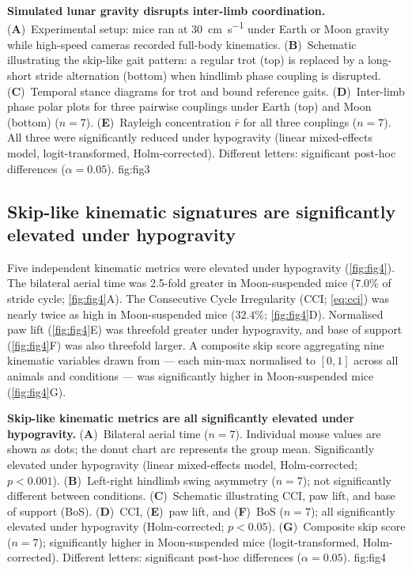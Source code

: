 \documentclass[blue]{enslyonstage}
\begin{document}
%
{%
\textbf{Simulated lunar gravity disrupts inter-limb coordination.}
(\textbf{A})~Experimental setup: mice ran at \qty{30}{\centi\metre\per\second}
under Earth or Moon gravity while high-speed cameras recorded full-body
kinematics\cite{santuzWalkingMoonHypogravity2026}.
(\textbf{B})~Schematic illustrating the skip-like gait pattern: a regular trot
(top) is replaced by a long-short stride alternation (bottom) when hindlimb
phase coupling is disrupted\cite{santuzWalkingMoonHypogravity2026}.
(\textbf{C})~Temporal stance diagrams for trot and bound reference gaits.
(\textbf{D})~Inter-limb phase polar plots for three pairwise couplings under
Earth (top) and Moon (bottom) ($n = 7$).
(\textbf{E})~Rayleigh concentration $\bar r$ for all three couplings ($n = 7$).
All three were significantly reduced under hypogravity (linear mixed-effects
model, logit-transformed, Holm-corrected). Different letters: significant
post-hoc differences ($\alpha = 0.05$).%
}{fig:fig3}

\subsection{Skip-like kinematic signatures are significantly elevated under hypogravity}

Five independent kinematic metrics were elevated under hypogravity
(\autoref{fig:fig4}). The bilateral aerial time was 2.5-fold greater in
Moon-suspended mice ($7.0\%$ of stride cycle; \autoref{fig:fig4}A). The
Consecutive Cycle Irregularity (CCI; \autoref{eq:cci}) was nearly twice as
high in Moon-suspended mice ($32.4\%$; \autoref{fig:fig4}D). Normalised paw
lift (\autoref{fig:fig4}E) was threefold greater under hypogravity, and base
of support (\autoref{fig:fig4}F) was also threefold larger. A composite skip
score aggregating nine kinematic variables drawn from
 --- each min-max normalised to $[0, 1]$
across all animals and conditions --- was significantly higher in Moon-suspended
mice (\autoref{fig:fig4}G).

%
{%
\textbf{Skip-like kinematic metrics are all significantly elevated under
hypogravity.}
(\textbf{A})~Bilateral aerial time ($n = 7$). Individual mouse values are
shown as dots; the donut chart arc represents the group mean. Significantly
elevated under hypogravity (linear mixed-effects model, Holm-corrected;
$p < 0.001$).
(\textbf{B})~Left-right hindlimb swing asymmetry ($n = 7$); not significantly
different between conditions.
(\textbf{C})~Schematic illustrating CCI, paw lift, and base of support (BoS).
(\textbf{D})~CCI, (\textbf{E})~paw lift, and (\textbf{F})~BoS ($n = 7$); all
significantly elevated under hypogravity (Holm-corrected; $p < 0.05$).
(\textbf{G})~Composite skip score ($n = 7$); significantly higher in
Moon-suspended mice (logit-transformed, Holm-corrected). Different letters:
significant post-hoc differences ($\alpha = 0.05$).%
}{fig:fig4}
\end{document}
